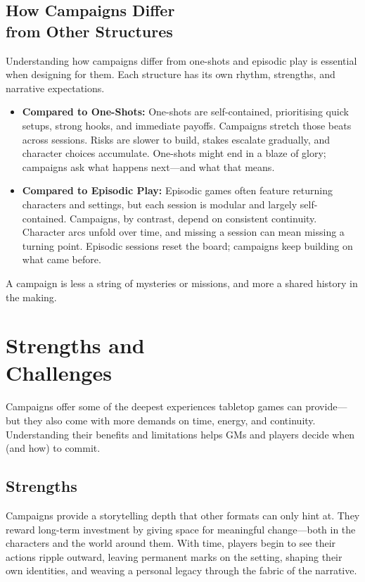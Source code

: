 \subsection*{How Campaigns Differ\\ from Other Structures}

Understanding how campaigns differ from one-shots and episodic play is essential when designing for them. Each structure has its own rhythm, strengths, and narrative expectations.

\begin{itemize}
    \item \textbf{Compared to One-Shots:}  
    One-shots are self-contained, prioritising quick setups, strong hooks, and immediate payoffs. Campaigns stretch those beats across sessions. Risks are slower to build, stakes escalate gradually, and character choices accumulate. One-shots might end in a blaze of glory; campaigns ask what happens next—and what that means.

    \item \textbf{Compared to Episodic Play:}  
    Episodic games often feature returning characters and settings, but each session is modular and largely self-contained. Campaigns, by contrast, depend on consistent continuity. Character arcs unfold over time, and missing a session can mean missing a turning point. Episodic sessions reset the board; campaigns keep building on what came before.
\end{itemize}

A campaign is less a string of mysteries or missions, and more a shared history in the making.

\section[Strengths and Challenges]{Strengths and\\ Challenges}

Campaigns offer some of the deepest experiences tabletop games can provide—but they also come with more demands on time, energy, and continuity. Understanding their benefits and limitations helps GMs and players decide when (and how) to commit.

\subsection*{Strengths}

Campaigns provide a storytelling depth that other formats can only hint at. They reward long-term investment by giving space for meaningful change—both in the characters and the world around them. With time, players begin to see their actions ripple outward, leaving permanent marks on the setting, shaping their own identities, and weaving a personal legacy through the fabric of the narrative.

